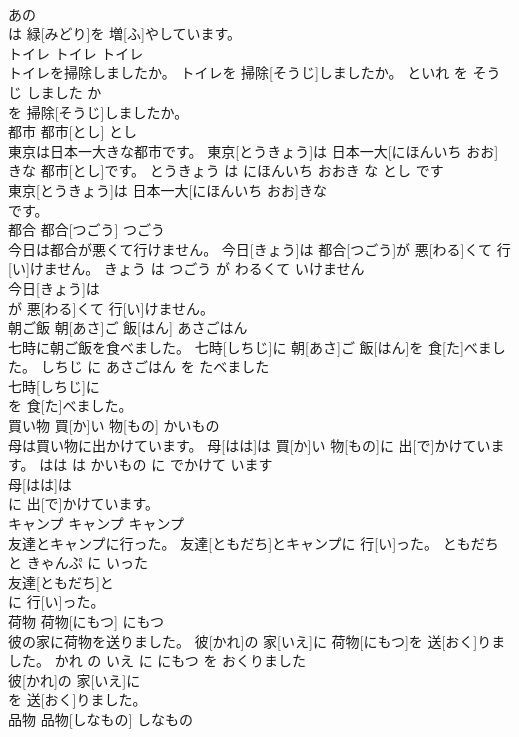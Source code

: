 \documentclass[8pt]{extreport}
\begin{document}
\begin{CJK}{UTF8}{min}
\\	あの
\\	は 緑[みどり]を 増[ふ]やしています。		
\\	トイレ	トイレ	トイレ	
\\	トイレを掃除しましたか。	トイレを 掃除[そうじ]しましたか。	といれ を そうじ しました か	
\\	を 掃除[そうじ]しましたか。		
\\	都市	都市[とし]	とし	
\\	東京は日本一大きな都市です。	東京[とうきょう]は 日本一大[にほんいち おお]きな 都市[とし]です。	とうきょう は にほんいち おおき な とし です	
\\	東京[とうきょう]は 日本一大[にほんいち おお]きな
\\	です。		
\\	都合	都合[つごう]	つごう	
\\	今日は都合が悪くて行けません。	今日[きょう]は 都合[つごう]が 悪[わる]くて 行[い]けません。	きょう は つごう が わるくて いけません	
\\	今日[きょう]は
\\	が 悪[わる]くて 行[い]けません。		
\\	朝ご飯	朝[あさ]ご 飯[はん]	あさごはん	
\\	七時に朝ご飯を食べました。	七時[しちじ]に 朝[あさ]ご 飯[はん]を 食[た]べました。	しちじ に あさごはん を たべました	
\\	七時[しちじ]に
\\	を 食[た]べました。		
\\	買い物	買[か]い 物[もの]	かいもの	
\\	母は買い物に出かけています。	母[はは]は 買[か]い 物[もの]に 出[で]かけています。	はは は かいもの に でかけて います	
\\	母[はは]は
\\	に 出[で]かけています。		
\\	キャンプ	キャンプ	キャンプ	
\\	友達とキャンプに行った。	友達[ともだち]とキャンプに 行[い]った。	ともだち と きゃんぷ に いった	
\\	友達[ともだち]と
\\	に 行[い]った。		
\\	荷物	荷物[にもつ]	にもつ	
\\	彼の家に荷物を送りました。	彼[かれ]の 家[いえ]に 荷物[にもつ]を 送[おく]りました。	かれ の いえ に にもつ を おくりました	
\\	彼[かれ]の 家[いえ]に
\\	を 送[おく]りました。		
\\	品物	品物[しなもの]	しなもの	

\end{CJK}
\end{document}
